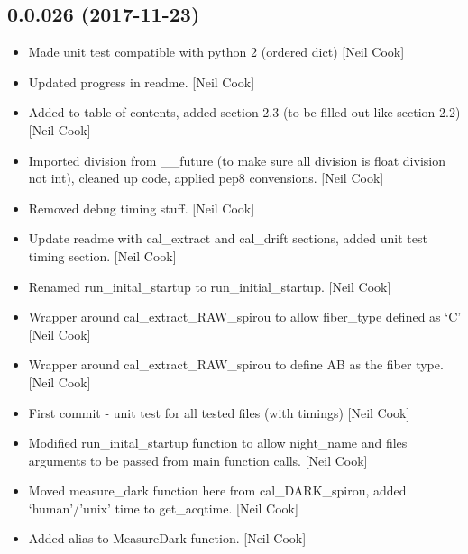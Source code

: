 \documentclass[a4paper,10pt,english]{report}
\begin{document}
\subsection{0.0.026 (2017-11-23)}
\label{\detokenize{misc/changelog:id524}}\begin{itemize}
\item {} 
Made unit test compatible with python 2 (ordered dict) {[}Neil Cook{]}

\item {} 
Updated progress in readme. {[}Neil Cook{]}

\item {} 
Added to table of contents, added section 2.3 (to be filled out like
section 2.2) {[}Neil Cook{]}

\item {} 
Imported division from \_\_future (to make sure all division is float
division not int), cleaned up code, applied pep8 convensions. {[}Neil
Cook{]}

\item {} 
Removed debug timing stuff. {[}Neil Cook{]}

\item {} 
Update readme with cal\_extract and cal\_drift sections, added unit test
timing section. {[}Neil Cook{]}

\item {} 
Renamed run\_inital\_startup to run\_initial\_startup. {[}Neil Cook{]}

\item {} 
Wrapper around cal\_extract\_RAW\_spirou to allow fiber\_type defined as
‘C’ {[}Neil Cook{]}

\item {} 
Wrapper around cal\_extract\_RAW\_spirou to define AB as the fiber type.
{[}Neil Cook{]}

\item {} 
First commit - unit test for all tested files (with timings) {[}Neil
Cook{]}

\item {} 
Modified run\_inital\_startup function to allow night\_name and files
arguments to be passed from main function calls. {[}Neil Cook{]}

\item {} 
Moved measure\_dark function here from cal\_DARK\_spirou, added
‘human’/’unix’ time to get\_acqtime. {[}Neil Cook{]}

\item {} 
Added alias to MeasureDark function. {[}Neil Cook{]}


\end{itemize}
\end{document}
